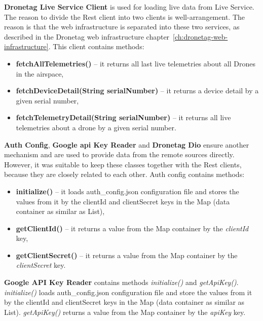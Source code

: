 \textbf{Dronetag Live Service Client} is used for loading live data from Live Service.
The reason to divide the Rest client into two clients is well-arrangement.
The reason is that the web infrastructure is separated into these two services, as described in the Dronetag web infrastructure chapter~\ref{ch:dronetag-web-infrastructure}.
This client contains methods:
\begin{itemize}
    \item \textbf{fetchAllTelemetries()} -- it returns all last live telemetries about all Drones in the airspace,
    \item \textbf{fetchDeviceDetail(String serialNumber)} -- it returns a device detail by a given serial number,
    \item \textbf{fetchTelemetryDetail(String serialNumber)} -- it returns all live telemetries about a drone by a given serial number.
\end{itemize}

\textbf{Auth Config}, \textbf{Google \acrshort{api} Key Reader} and \textbf{Dronetag Dio} ensure another mechanism and are used to provide data from the remote sources directly.
However, it was suitable to keep these classes together with the Rest clients, because they are closely related to each other.
Auth config contains methods:
\begin{itemize}
    \item \textbf{initialize()} -- it loads auth\_config.json configuration file and stores the values from it by the clientId and clientSecret keys in the Map (data container as similar as List),
    \item \textbf{getClientId()} -- it returns a value from the Map container by the \textit{clientId} key,
    \item \textbf{getClientSecret()} -- it returns a value from the Map container by the \textit{clientSecret} key.
\end{itemize}

\textbf{Google API Key Reader} contains methods \textit{initialize()} and \textit{getApiKey()}.
\textit{initialize()} loads auth\_config.json configuration file and store the values from it by the clientId and clientSecret keys in the Map (data container as similar as List).
\textit{getApiKey()} returns a value from the Map container by the \textit{apiKey} key.
